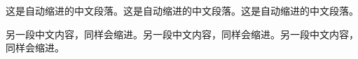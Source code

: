\documentclass[12pt]{ctexbook}
\begin{document}
这是自动缩进的中文段落。这是自动缩进的中文段落。这是自动缩进的中文段落。

另一段中文内容，同样会缩进。另一段中文内容，同样会缩进。另一段中文内容，同样会缩进。
\end{document}
